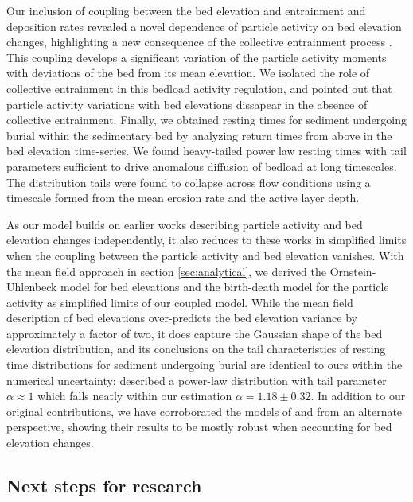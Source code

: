 Our inclusion of coupling between the bed elevation and entrainment and deposition rates revealed a novel dependence of particle activity on bed elevation changes,  highlighting a new consequence of the collective entrainment process \citep{Ancey2008,Lee2018}. This coupling develops a significant variation of the particle activity moments with deviations of the bed from its mean elevation. We isolated the role of collective entrainment in this bedload activity regulation, and pointed out that particle activity variations with bed elevations dissapear in the absence of collective entrainment.
Finally, we obtained resting times for sediment undergoing burial within the sedimentary bed by analyzing return times from above in the bed elevation time-series. We found heavy-tailed power law resting times with tail parameters sufficient to drive anomalous diffusion of bedload at long timescales.
The distribution tails were found to collapse across flow conditions using a timescale formed from the mean erosion rate and the active layer depth.

As our model builds on earlier works describing particle activity and bed elevation changes independently, it also reduces to these works in simplified limits when the coupling between the particle activity and bed elevation vanishes.
With the mean field approach in section \ref{sec:analytical}, we derived the \citet{Martin2014} Ornstein-Uhlenbeck model for bed elevations and the \citet{Ancey2008} birth-death model for the particle activity as simplified limits of our coupled model. While the mean field description of bed elevations over-predicts the bed elevation variance by approximately a factor of two, it does capture the Gaussian shape of the bed elevation distribution, and its conclusions on the tail characteristics of resting time distributions for sediment undergoing burial are identical to ours within the numerical uncertainty: \citet{Martin2014} described a power-law distribution with tail parameter $\alpha \approx 1$ which falls neatly within our estimation $\alpha = 1.18 \pm 0.32$. In addition to our original contributions, we have corroborated the models of \citet{Ancey2008} and \citet{Martin2014} from an alternate perspective, showing their results to be mostly robust when accounting for bed elevation changes.


\subsection{Next steps for research}

